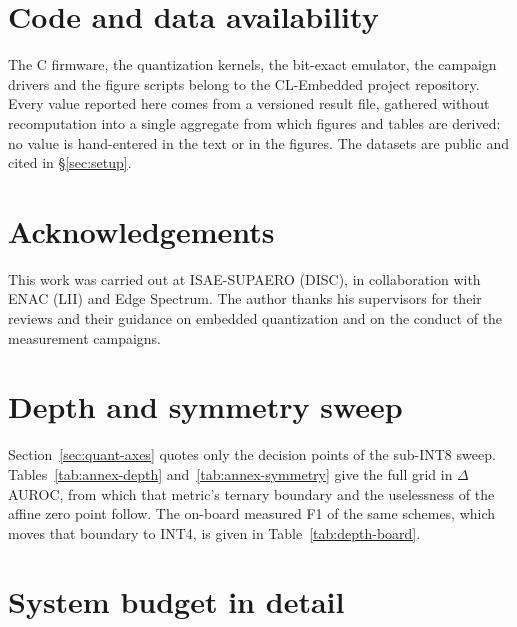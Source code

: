 \documentclass[11pt,a4paper]{article}
\begin{document}
\section*{Code and data availability}

The C firmware, the quantization kernels, the bit-exact emulator, the campaign drivers and the figure
scripts belong to the CL-Embedded project repository. Every value reported here comes from a versioned
result file, gathered without recomputation into a single aggregate from which figures and tables are
derived: no value is hand-entered in the text or in the figures. The datasets are public and cited in
\S\ref{sec:setup}.

\section*{Acknowledgements}

This work was carried out at ISAE-SUPAERO (DISC), in collaboration with ENAC (LII) and Edge Spectrum. The
author thanks his supervisors for their reviews and their guidance on embedded quantization and on the
conduct of the measurement campaigns.




\appendix

\section{Depth and symmetry sweep}
\label{app:depth}

Section~\ref{sec:quant-axes} quotes only the decision points of the sub-INT8 sweep.
Tables~\ref{tab:annex-depth} and~\ref{tab:annex-symmetry} give the full grid in
$\Delta$AUROC, from which that metric's ternary boundary and the uselessness of the
affine zero point follow. The on-board measured F1 of the same schemes, which moves
that boundary to INT4, is given in Table~\ref{tab:depth-board}.




\section{System budget in detail}
\label{app:budget}
\end{document}
